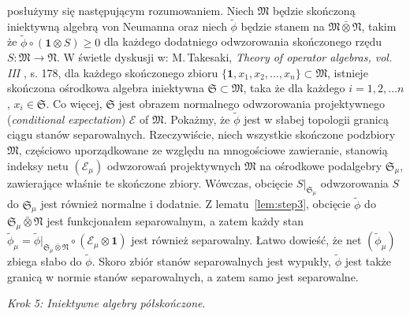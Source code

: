 posłużymy się następującym rozumowaniem.
Niech $\mathfrak{M}$ będzie skończoną iniektywną algebrą von Neumanna oraz
niech $\tilde{\phi}$ będzie stanem na $\mathfrak{M} \bar{\otimes} \mathfrak{N}$,
takim że $\tilde{\phi} \circ (\mathbf{1} \otimes S) \geq 0$
dla każdego dodatniego odwzorowania skończonego rzędu
$S:\mathfrak{M} \rightarrow \mathfrak{N}$.
W świetle dyskusji w: M.\,Takesaki, \emph{Theory of operator algebras, vol. III}
\cite{Takesaki3}, s. 178,
dla każdego skończonego zbioru
$\{ \mathbf{1}, x_{1}, x_{2}, \ldots, x_{n} \} \subset \mathfrak{M}$,
istnieje skończona ośrodkowa algebra iniektywna
$\mathfrak{S} \subset \mathfrak{M}$,
taka że dla każdego $i =1, 2, \ldots n$, $x_{i} \in \mathfrak{S}$.
Co więcej, $\mathfrak{S}$
jest obrazem normalnego odwzorowania projektywnego
(\emph{conditional expectation}) $\mathcal{E}$ of $\mathfrak{M}$.
Pokażmy, że $\tilde{\phi}$ jest w słabej topologii granicą ciągu stanów separowalnych.
Rzeczywiście, niech wszystkie skończone podzbiory $\mathfrak{M}$,
częściowo uporządkowane ze względu na mnogościowe zawieranie,
stanowią indeksy netu $(\mathcal{E}_{\mu})$
odwzorowań projektywnych $\mathfrak{M}$
na ośrodkowe podalgebry $\mathfrak{S}_{\mu}$,
zawierające właśnie te skończone zbiory.
Wówczas, obcięcie $S|_{\mathfrak{S}_{\mu}}$ odwzorowania $S$
do $\mathfrak{S}_{\mu}$ jest również normalne i dodatnie.
Z \mbox{lematu \ref{lem:step3}}, obcięcie $\tilde{\phi}$ do
$\mathfrak{S}_{\mu} \bar{\otimes} \mathfrak{N}$
jest funkcjonałem separowalnym, a zatem każdy stan
$\tilde{\phi}_{\mu} = \tilde{\phi}|_{\mathfrak{S}_{\mu}
\bar{\otimes} \mathfrak{N}} \circ (\mathcal{E}_{\mu} \otimes \mathbf{1})$
jest również separowalny.
Łatwo dowieść, że net $(\tilde{\phi}_{\mu})$ zbiega słabo do $\tilde{\phi}$.
Skoro zbiór stanów separowalnych jest wypukły,
$\tilde{\phi}$ jest także granicą w normie stanów separowalnych, a zatem samo
jest separowalne.

{\it Krok 5: Iniektywne algebry półskończone}.

